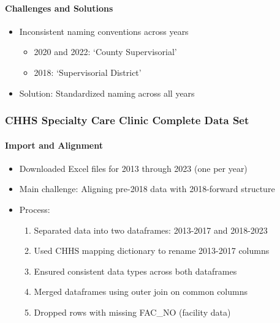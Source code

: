 \documentclass[
  11pt,
  letterpaper,
  DIV=11,
  numbers=noendperiod]{scrartcl}
\let\oldparagraph\paragraph
\renewcommand{\paragraph}[1]{\oldparagraph{#1}\mbox{}}
\providecommand{\tightlist}{%
  \setlength{\itemsep}{0pt}\setlength{\parskip}{0pt}}\usepackage{longtable,booktabs,array}
\begin{document}
\paragraph{Challenges and Solutions}\label{challenges-and-solutions-1}

\begin{itemize}
\tightlist
\item
  Inconsistent naming conventions across years

  \begin{itemize}
  \tightlist
  \item
    2020 and 2022: `County Supervisorial'
  \item
    2018: `Supervisorial District'
  \end{itemize}
\item
  Solution: Standardized naming across all years
\end{itemize}

\subsubsection{CHHS Specialty Care Clinic Complete Data
Set}\label{chhs-specialty-care-clinic-complete-data-set}

\paragraph{Import and Alignment}\label{import-and-alignment}

\begin{itemize}
\tightlist
\item
  Downloaded Excel files for 2013 through 2023 (one per year)
\item
  Main challenge: Aligning pre-2018 data with 2018-forward structure
\item
  Process:

  \begin{enumerate}
  \def\labelenumi{\arabic{enumi}.}
  \tightlist
  \item
    Separated data into two dataframes: 2013-2017 and 2018-2023
  \item
    Used CHHS mapping dictionary to rename 2013-2017 columns
  \item
    Ensured consistent data types across both dataframes
  \item
    Merged dataframes using outer join on common columns
  \item
    Dropped rows with missing FAC\_NO (facility data)
  \end{enumerate}
\end{itemize}
\end{document}
